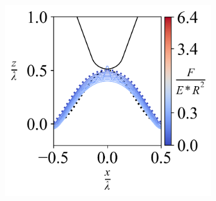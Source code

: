 \begin{figure}[H]
\begin{subfigure}{0.32\textwidth}
    \end{subfigure}
    \hfill
    \begin{subfigure}{0.32\textwidth}
        \centering
        \caption{\label{fig: All-Wave-LineContour-3}}
        \includegraphics[width=1\linewidth]{Figures/Wave-LineContour-3.png}
    \end{subfigure}



    \hfill
    \vspace{-0.3in}



\end{figure}
